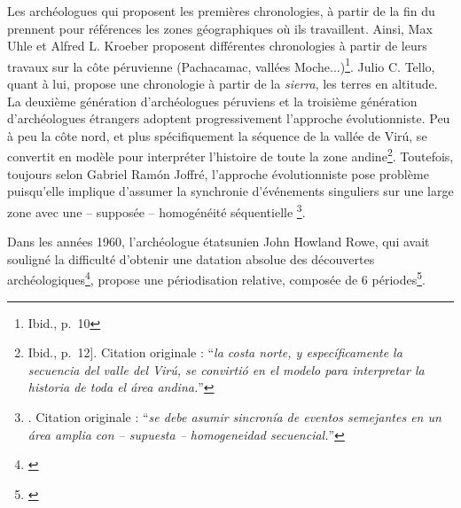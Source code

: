 Les archéologues qui proposent les premières chronologies, à partir de la fin du  prennent pour références les zones géographiques où ils travaillent. Ainsi, Max Uhle et Alfred L. Kroeber proposent différentes chronologies à partir de leurs travaux sur la côte péruvienne (Pachacamac, vallées Moche...)\footnote{Ibid., p.~10}. Julio C. Tello, quant à lui, propose une chronologie à partir de la \textit{sierra}, les terres en altitude.
La deuxième génération d'archéologues péruviens et la troisième génération d'archéologues étrangers adoptent progressivement l'approche évolutionniste. Peu à peu \og la côte nord, et plus spécifiquement la séquence de la vallée de Virú, se convertit en modèle pour interpréter l'histoire de toute la zone andine\footnote{Ibid., p.~12]. Citation originale : \textquotedblleft \textit{la costa norte, y específicamente la secuencia del valle del Virú, se convirtió en el modelo para interpretar la historia de toda el área andina.}\textquotedblright}. \fg \:Toutefois, toujours selon Gabriel Ramón Joffré, l'approche évolutionniste pose problème puisqu'elle implique \og d'assumer la synchronie d'événements singuliers sur une large zone avec une -- supposée -- homogénéité séquentielle \footnote{\cite[p.~13]{ramonjoffrePeriodificacionArqueologiaPeruana2005}. Citation originale : \textquotedblleft \textit{se debe asumir sincronía de eventos semejantes en un área amplia con -- supuesta -- homogeneidad secuencial.}\textquotedblright}. \fg \: 

Dans les années 1960, l'archéologue étatsunien John Howland Rowe, qui avait souligné la difficulté d'obtenir une datation absolue des découvertes archéologiques\footnote{\cite{roweAbsoluteChronologyAndean1945}}, propose une périodisation relative, composée de 6 périodes\footnote{\cite[p.~627]{roweCulturalUnityDiversification1960}}.

